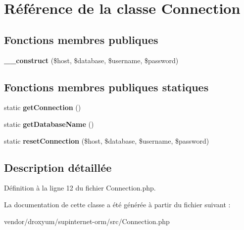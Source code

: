 \hypertarget{class_o_r_m_1_1_connection}{}\section{Référence de la classe Connection}
\label{class_o_r_m_1_1_connection}
\subsection*{Fonctions membres publiques}
\begin{DoxyCompactItemize}
\item 
{\bfseries \+\_\+\+\_\+construct} (\$host, \$database, \$username, \$password)\hypertarget{class_o_r_m_1_1_connection_a3b5598a4ff02d3ae4e24d37c2eab2a6d}{}\label{class_o_r_m_1_1_connection_a3b5598a4ff02d3ae4e24d37c2eab2a6d}

\end{DoxyCompactItemize}
\subsection*{Fonctions membres publiques statiques}
\begin{DoxyCompactItemize}
\item 
static {\bfseries get\+Connection} ()\hypertarget{class_o_r_m_1_1_connection_a6b25efc0b7bf136a727f36f22577b06c}{}\label{class_o_r_m_1_1_connection_a6b25efc0b7bf136a727f36f22577b06c}

\item 
static {\bfseries get\+Database\+Name} ()\hypertarget{class_o_r_m_1_1_connection_a30ecb3dafefa639a65b19fe05865dc7d}{}\label{class_o_r_m_1_1_connection_a30ecb3dafefa639a65b19fe05865dc7d}

\item 
static {\bfseries reset\+Connection} (\$host, \$database, \$username, \$password)\hypertarget{class_o_r_m_1_1_connection_ad59a06f5d8d12b4043f7b915bf72e965}{}\label{class_o_r_m_1_1_connection_ad59a06f5d8d12b4043f7b915bf72e965}

\end{DoxyCompactItemize}


\subsection{Description détaillée}


Définition à la ligne 12 du fichier Connection.\+php.



La documentation de cette classe a été générée à partir du fichier suivant \+:\begin{DoxyCompactItemize}
\item 
vendor/droxyum/supinternet-\/orm/src/Connection.\+php\end{DoxyCompactItemize}
